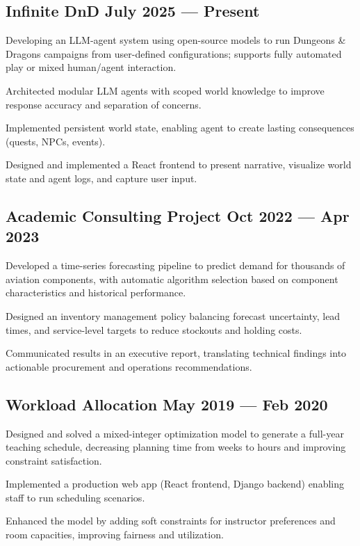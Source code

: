 \subsection{{Infinite DnD \hfill July 2025 --- Present}}
\begin{zitemize}
    \setlength\itemsep{0.4em}
    \item Developing an LLM-agent system using open-source models to run Dungeons \& Dragons campaigns from user-defined configurations; supports fully automated play or mixed human/agent interaction.
    \item Architected modular LLM agents with scoped world knowledge to improve response accuracy and separation of concerns.
    \item Implemented persistent world state, enabling agent to create lasting consequences (quests, NPCs, events).
    \item Designed and implemented a React frontend to present narrative, visualize world state and agent logs, and capture user input.
\end{zitemize}
\vspace{0.75em}

\subsection{{Academic Consulting Project \hfill Oct 2022 --- Apr 2023}}
\begin{zitemize}
    \setlength\itemsep{0.4em}
    \item Developed a time-series forecasting pipeline to predict demand for thousands of aviation components, with automatic algorithm selection based on component characteristics and historical performance.
    \item Designed an inventory management policy balancing forecast uncertainty, lead times, and service-level targets to reduce stockouts and holding costs.
    \item Communicated results in an executive report, translating technical findings into actionable procurement and operations recommendations.
\end{zitemize}
\vspace{0.75em}

\subsection{{Workload Allocation \hfill May 2019 --- Feb 2020}}
\begin{zitemize}
    \setlength\itemsep{0.4em}
    \item Designed and solved a mixed-integer optimization model to generate a full-year teaching schedule, decreasing planning time from weeks to hours and improving constraint satisfaction.
    \item Implemented a production web app (React frontend, Django backend) enabling staff to run scheduling scenarios.
    \item Enhanced the model by adding soft constraints for instructor preferences and room capacities, improving fairness and utilization.
\end{zitemize}